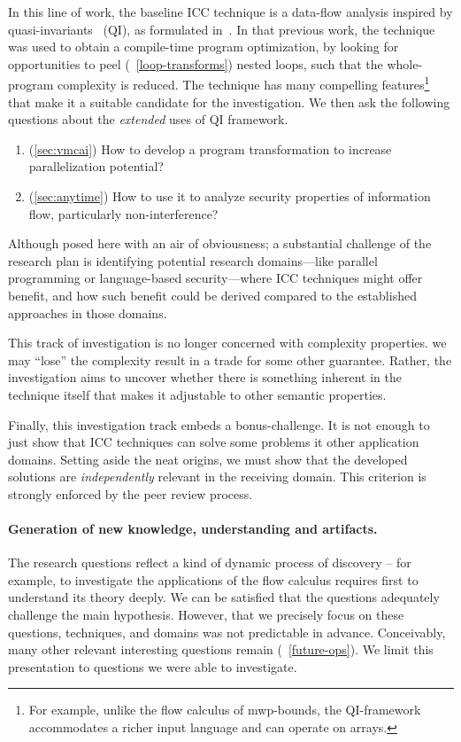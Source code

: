 In this line of work, the baseline ICC technique is a data-flow analysis inspired by quasi-invariants~\cite{marion2000} (QI),
as formulated in~\textcite{moyen20172}.
In that previous work, the technique was used to obtain a compile-time program optimization,
by looking for opportunities to peel (\cf~\autoref{loop-transforms}) nested loops, such that the whole-program complexity is reduced.
The technique has many compelling features\footnote{
For example, unlike the flow calculus of mwp-bounds, the QI-framework accommodates a richer input language and can operate on arrays.}
that make it a suitable candidate for the investigation.
We then ask the following questions about the \emph{extended} uses of QI framework.

\begin{enumerate}
\item (\autoref{sec:vmcai}) How to develop a program transformation to increase parallelization potential?
\item (\autoref{sec:anytime}) How to use it to analyze security properties of information flow, particularly non-interference?
\end{enumerate}

Although posed here with an air of obviousness;
a substantial challenge of the research plan is {identifying} potential research domains---like parallel programming or language-based security---where ICC techniques might offer benefit, and how such benefit could be derived compared to the established approaches in those domains.

This track of investigation is no longer concerned with complexity properties.
\Ie we may \enquote{lose} the complexity result in a trade for some other guarantee.
Rather, the investigation aims to uncover whether there is something inherent in the {technique} itself that makes it adjustable to other semantic properties.

Finally, this investigation track embeds a {bonus-challenge}.
It is not enough to just show that ICC techniques can solve some problems it other application domains.
Setting aside the neat origins, we must show that the developed solutions are \emph{independently} relevant in the receiving domain.
This criterion is strongly enforced by the peer review process.

\paragraph*{Generation of new knowledge, understanding and artifacts.}
The research questions reflect a kind of dynamic process of discovery --
for example, to investigate the applications of the flow calculus requires first to understand its theory deeply.
We can be satisfied that the questions adequately challenge the main hypothesis.
However, that we precisely focus on these questions, techniques, and domains was not predictable in advance.
Conceivably, many other relevant interesting questions remain (\cf~\autoref{future-ops}).
We limit this presentation to questions we were able to investigate.

